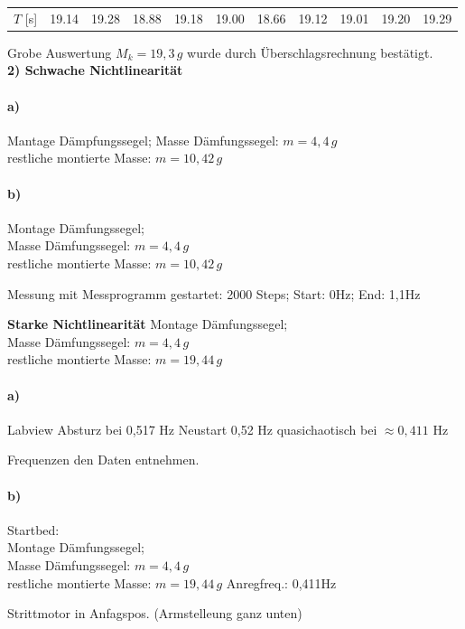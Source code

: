 \begin{tabular}{c | cccccccccc}
    $T$ [s]&19.14&19.28&18.88&19.18&19.00&18.66&19.12&19.01&19.20&19.29\\
\end{tabular}

Grobe Auswertung \(M_k = 19,3 \, g\) wurde durch Überschlagsrechnung bestätigt.\\

\textbf{2) Schwache Nichtlinearität}\\
\paragraph{a)}
Mantage Dämpfungssegel; Masse Dämfungssegel: \(m=4,4 \, g\)\\
restliche montierte Masse: \( m = 10,42 \,g \)

\paragraph{b)}
Montage Dämfungssegel;\\
Masse Dämfungssegel: \(m=4,4 \, g\)\\
restliche montierte Masse: \( m = 10,42 \,g \)

Messung mit Messprogramm gestartet: 2000 Steps; Start: 0Hz; End: 1,1Hz

\textbf{Starke Nichtlinearität}
Montage Dämfungssegel;\\
Masse Dämfungssegel: \(m=4,4 \, g\)\\
restliche montierte Masse: \( m = 19,44 \,g \)

\paragraph{a)}
Labview Absturz bei 0,517 Hz 
Neustart 0,52 Hz
quasichaotisch bei $\approx0,411$ Hz

Frequenzen den Daten entnehmen.

\paragraph{b)}
Startbed: \\
Montage Dämfungssegel;\\
Masse Dämfungssegel: \(m=4,4 \, g\)\\
restliche montierte Masse: \( m = 19,44 \,g \)
Anregfreq.: 0,411Hz

Strittmotor in Anfagspos. (Armstelleung ganz unten)

